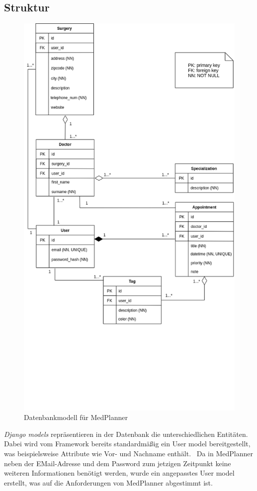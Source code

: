 \documentclass[conference]{IEEEtran}
\begin{document}
\subsection{Struktur}\label{structure}
\begin{figure}[!h]
	\centering
	\includegraphics[width=0.9\columnwidth]{./figures/concepts}
	\caption{Datenbankmodell für MedPlanner}
\end{figure}
\textit{Django models} repräsentieren in der Datenbank die unterschiedlichen Entitäten. Dabei wird vom Framework bereits standardmäßig ein User model bereitgestellt, was beispielsweise Attribute wie Vor- und Nachname enthält.~\cite{django-default-user} Da in MedPlanner neben der EMail-Adresse und dem Password zum jetzigen Zeitpunkt keine weiteren Informationen benötigt werden, wurde ein angepasstes User model erstellt, was auf die Anforderungen von MedPlanner abgestimmt ist.
\end{document}
